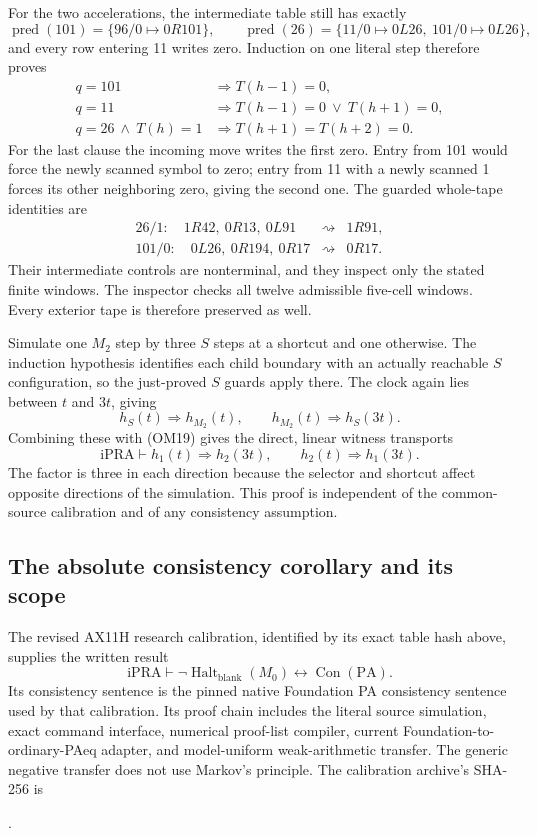 For the two accelerations, the intermediate table still has exactly
\[
 \operatorname{pred}(101)=\{96/0\mapsto0R101\},\qquad
 \operatorname{pred}(26)=\{11/0\mapsto0L26,\ 101/0\mapsto0L26\},
\]
and every row entering 11 writes zero.  Induction on one literal step
therefore proves
\[
\begin{split}
 q=101&\Rightarrow T(h-1)=0,\\
 q=11&\Rightarrow T(h-1)=0\ \lor\ T(h+1)=0,\\
 q=26\ \land\ T(h)=1&\Rightarrow T(h+1)=T(h+2)=0.
\end{split}
\]
For the last clause the incoming move writes the first zero.  Entry from
101 would force the newly scanned symbol to zero; entry from 11 with a
newly scanned 1 forces its other neighboring zero, giving the second one.
The guarded whole-tape identities are
\[
 \begin{array}{rcl}
 26/1:\quad1R42,\ 0R13,\ 0L91&\rightsquigarrow&1R91,\\
 101/0:\quad0L26,\ 0R194,\ 0R17&\rightsquigarrow&0R17.
 \end{array}
\]
Their intermediate controls are nonterminal, and they inspect only the
stated finite windows.  The inspector checks all twelve admissible
five-cell windows.  Every exterior tape is therefore preserved as well.

Simulate one $M_2$ step by three $S$ steps at a shortcut and one otherwise.
The induction hypothesis identifies each child boundary with an actually
reachable $S$ configuration, so the just-proved $S$ guards apply there.
The clock again lies between $t$ and $3t$, giving
\[
              h_S(t)\Rightarrow h_{M_2}(t),\qquad
              h_{M_2}(t)\Rightarrow h_S(3t).
\]
Combining these with (OM19) gives the direct, linear witness transports
\[
       \mathrm{iPRA}\vdash
       h_1(t)\Rightarrow h_2(3t),\qquad
       h_2(t)\Rightarrow h_1(3t).                           \tag{OM20}
\]
The factor is three in each direction because the selector and shortcut
affect opposite directions of the simulation.  This proof is independent
of the common-source calibration and of any consistency assumption.

\subsection{The absolute consistency corollary and its scope}

The revised AX11H research calibration, identified by its exact table hash
above, supplies the written result
\[
 \mathrm{iPRA}\vdash
 \neg\operatorname{Halt}_{\mathrm{blank}}(M_0)
      \longleftrightarrow\operatorname{Con}(\mathrm{PA}). \tag{OM21}
\]
Its consistency sentence is the pinned native Foundation PA consistency
sentence used by that calibration.  Its proof chain includes the literal
source simulation, exact command interface, numerical proof-list compiler,
current Foundation-to-ordinary-PAeq adapter, and model-uniform weak-arithmetic
transfer.  The generic negative transfer does not use Markov's principle.
The calibration archive's SHA-256 is\nopagebreak
\begin{center}\footnotesize
{}.
\end{center}

